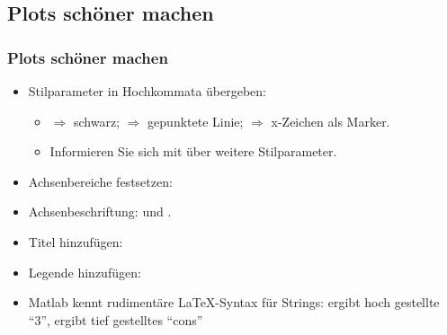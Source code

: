       \subsection{Plots schöner machen}
      \begin{frame}
          \frametitle{Plots schöner machen}

          \vspace{-1.0cm}

          \begin{itemize}
              \item Stilparameter in Hochkommata übergeben: 
              \begin{itemize}
                  \item {} $\Rightarrow$ schwarz; \matlabInput{:} $\Rightarrow$ gepunktete Linie;  $\Rightarrow$ x-Zeichen als Marker.
                  \item Informieren Sie sich mit  über weitere Stilparameter.
              \end{itemize}
              \item Achsenbereiche festsetzen: 
              \item Achsenbeschriftung:  und .
              \item Titel hinzufügen: 
              \item Legende hinzufügen: 
              \item Matlab kennt rudimentäre \LaTeX-Syntax für Strings:  ergibt hoch gestellte ``3'',
               ergibt tief gestelltes ``cons''
          \end{itemize}
      \end{frame}


